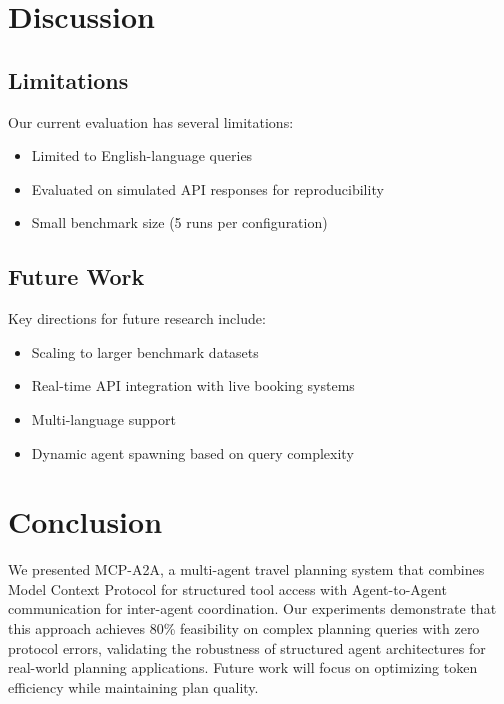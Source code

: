 \documentclass[11pt,a4paper]{article}
\begin{document}
\section{Discussion}

\subsection{Limitations}
Our current evaluation has several limitations:
\begin{itemize}
    \item Limited to English-language queries
    \item Evaluated on simulated API responses for reproducibility
    \item Small benchmark size (5 runs per configuration)
\end{itemize}

\subsection{Future Work}
Key directions for future research include:
\begin{itemize}
    \item Scaling to larger benchmark datasets
    \item Real-time API integration with live booking systems
    \item Multi-language support
    \item Dynamic agent spawning based on query complexity
\end{itemize}

\section{Conclusion}

We presented MCP-A2A, a multi-agent travel planning system that combines Model Context Protocol for structured tool access with Agent-to-Agent communication for inter-agent coordination. Our experiments demonstrate that this approach achieves 80\% feasibility on complex planning queries with zero protocol errors, validating the robustness of structured agent architectures for real-world planning applications. Future work will focus on optimizing token efficiency while maintaining plan quality.
\end{document}
